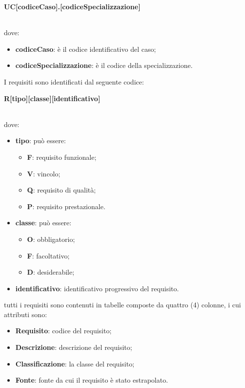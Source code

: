 	    \centerline{\textbf{UC[codiceCaso].[codiceSpecializzazione]}}\\
	    dove:
	    \begin{itemize}
	        \item \textbf{codiceCaso}: è il codice identificativo del caso;
	        \item \textbf{codiceSpecializzazione}: è il codice della specializzazione.
	    \end{itemize}
	    I requisiti sono identificati dal seguente codice:\\
	    \centerline{\textbf{R[tipo][classe][identificativo]}}\\
	    dove:
	    \begin{itemize}
	        \item \textbf{tipo}: può essere:
	        \begin{itemize}
	            \item \textbf{F}: requisito funzionale;
	            \item \textbf{V}: vincolo;
	            \item \textbf{Q}: requisito di qualità;
	            \item \textbf{P}: requisito prestazionale. 
	        \end{itemize}
	        \item \textbf{classe}: può essere:
	        \begin{itemize}
	            \item \textbf{O}: obbligatorio;
	            \item \textbf{F}: facoltativo;
	            \item \textbf{D}: desiderabile;
	        \end{itemize}
	        \item \textbf{identificativo}: identificativo progressivo del requisito.
	    \end{itemize}
	    tutti i requisiti sono contenuti in tabelle composte da quattro (4) colonne, i cui attributi sono:
	    \begin{itemize}
	        \item \textbf{Requisito}: codice del requisito;
	        \item \textbf{Descrizione}: descrizione del requisito;
	        \item \textbf{Classificazione}: la classe del requisito;
	        \item \textbf{Fonte}: fonte da cui il requisito è stato estrapolato.
	    \end{itemize}
